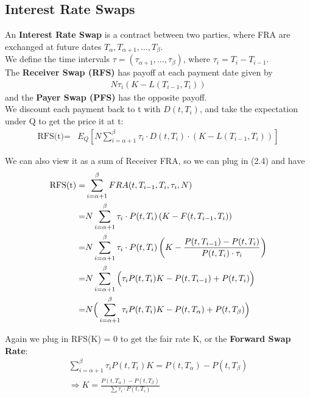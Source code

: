 \subsection{Interest Rate Swaps}
\begin{definition}
    An \textbf{Interest Rate Swap} is a contract between two parties, where FRA are exchanged at future dates $T_{\alpha}, T_{\alpha+1}, \dots, T_{\beta}$.\\
    We define the time intervals $\tau = (\tau_{\alpha+1}, \dots, \tau_{\beta})$, where $\tau_i = T_{i} - T_{i-1}$.\\
    The \textbf{Receiver Swap (RFS)} has payoff at each payment date given by
    \begin{align*}
        N \tau_i (K - L(T_{i-1}, T_i))  
    \end{align*}
    and the  \textbf{Payer Swap (PFS)} has the opposite payoff.\\
    We discount each payment back to t with  $D(t, T_i)$, and take the expectation under Q to get the price it at t:
    \begin{align}
        \text{RFS(t)} =& E_Q\left[ N \sum_{i = \alpha + 1}^{\beta} \tau_i \cdot D(t, T_i) \cdot (K - L(T_{i-1}, T_i)) \right]  
    \end{align}

    We can also view it as a sum of Receiver FRA, so we can plug in (2.4) and have
    \begin{align}
        \text{RFS(t)} =& \sum_{i = \alpha + 1}^{\beta} FRA(t, T_{i-1}, T_i, \tau_i, N) \notag \\
        =& N \sum_{i = \alpha + 1}^{\beta} \tau_i \cdot P(t, T_i) \left( K - F(t, T_{i-1}, T_i) \right) \notag\\
        =& N \sum_{i = \alpha + 1}^{\beta} \tau_i \cdot P(t, T_i)\left( K - \frac{P(t, T_{i-1}) - P(t, T_i)}{P(t, T_i) \cdot \tau_i}\right) \notag\\
        =& N \sum_{i = \alpha + 1}^{\beta} \Big( \tau_i P(t, T_i)  K - P(t, T_{i-1}) + P(t, T_i) \Big) \notag\\
        =& N \Big( \sum_{i = \alpha + 1}^{\beta} \tau_i P(t, T_i)  K - P(t, T_{\alpha}) + P(t, T_{\beta}) \Big) 
    \end{align}
    
    
    
    
    
\end{definition}

Again we plug in RFS(K) = 0 to get the fair rate K, or the \textbf{Forward Swap Rate}:
\begin{align*}
    \sum_{i = \alpha + 1}^{\beta} \tau_i P(t, T_i)  K  = P(t, T_{\alpha}) - P(t, T_{\beta})\\
    \Rightarrow K = \frac{P(t, T_{\alpha}) - P(t, T_{\beta})}{\sum \tau_i \cdot P(t, T_i)}
\end{align*}

